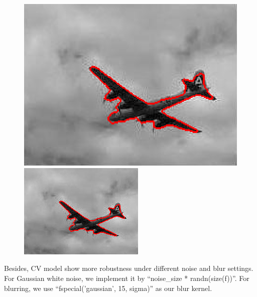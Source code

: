\documentclass{article}
\begin{document}
\begin{figure}[H]
\begin{center}
\includegraphics[scale=.23]{cv20.png}
\includegraphics[scale=.68]{cv100.png}
\end{center}
\end{figure}

Besides, CV model show more robustness under different noise and blur settings. For Gaussian white noise, we implement it by ``noise\_size * randn(size(f))''. For blurring, we use ``fspecial('gaussian', 15, sigma)'' as our blur kernel.
\end{document}
